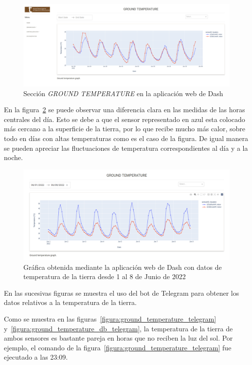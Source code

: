 \documentclass[a4paper, 12pt, oneside]{book}
\begin{document}
\begin{figure}[H]
	\centering
    \includegraphics[width=12cm, keepaspectratio]{img/ground_temperature_dash}
    \caption{Sección \textit{GROUND TEMPERATURE} en la aplicación web de Dash}
    \label{figura:ground_temperature_dash}
\end{figure}


En la figura~\ref{figura:ground_temperature_01_08_junio} se puede observar una diferencia clara en las medidas de las horas centrales del día. Esto se debe a que el sensor representado en azul esta colocado más cercano a la superficie de la tierra, por lo que recibe mucho más calor, sobre todo en días con altas temperaturas como es el caso de la figura. De igual manera se pueden apreciar las fluctuaciones de temperatura correspondientes al día y a la noche.
\begin{figure}[H]
	\centering
    \includegraphics[width=12cm, keepaspectratio]{img/ground_temperature_01_08_junio}
    \caption{Gráfica obtenida mediante la aplicación web de Dash con datos de temperatura de la tierra desde 1 al 8 de Junio de 2022}
    \label{figura:ground_temperature_01_08_junio}
\end{figure}

En las sucesivas figuras se muestra el uso del bot de Telegram para obtener los datos relativos a la temperatura de la tierra.

Como se muestra en las figuras~\ref{figura:ground_temperature_telegram} y~\ref{figura:ground_temperature_db_telegram}, la temperatura de la tierra de ambos sensores es bastante pareja en horas que no reciben la luz del sol. Por ejemplo, el comando de la figura~\ref{figura:ground_temperature_telegram} fue ejecutado a las 23:09.
\end{document}
